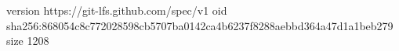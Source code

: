 version https://git-lfs.github.com/spec/v1
oid sha256:868054c8c772028598cb5707ba0142ca4b6237f8288aebbd364a47d1a1beb279
size 1208

